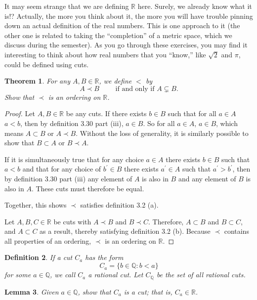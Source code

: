\documentclass{amsart}
\newtheorem{theorem}{Theorem}
\newtheorem{lemma}[theorem]{Lemma}
\newtheorem{definition}[theorem]{Definition}
\newcommand{\Q}{\mathbb Q}
\newcommand{\R}{\mathbb R}
\newcommand{\1}{\mathds{1}}
\def \R {{\mathbb {R}}}
\numberwithin{equation}{section}
\numberwithin{theorem}{section}
\begin{document}
It may seem strange that we are defining $\R$ here.  Surely, we already know what it is!?  Actually, the more you think about it, the more you will have trouble pinning down an actual definition of the real numbers.  This is one approach to it (the other one is related to taking the ``completion'' of a metric space, which we discuss during the semester).  As you go through these exercises, you may find it interesting to think about how real numbers that you ``know,'' like $\sqrt 2$ and $\pi$, could be defined using cuts.


\begin{theorem}
	For any $A, B\in \R$, we define $<$ by
	\[
	A \prec B
	\qquad\text{ if and only if }
	A \subsetneq B.
	\]
	Show that $\prec$ is an ordering on $\R$.
\end{theorem}

\begin{proof}
	Let $A,B \in\R$ be any cuts. If there exists $b\in B$ such that for all $a\in A$ $a<b$, then by definition 3.30 part (iii), $a\in B$. So for all $a\in A$, $a\in B$, which means $A\subset B$ or $A\prec B$. Without the loss of generality, it is similarly possible to show that $B\subset A$ or $B\prec A$. 
	
	If it is simultaneously true that for any choice $a\in A$ there exists $b\in B$ such that $a<b$ and that for any choice of $b^\prime\in B$ there exists $a^\prime\in A$ such that $a^\prime>b^\prime$, then by definition 3.30 part (iii) any element of $A$ is also in $B$ and any element of $B$ is also in $A$. These cuts must therefore be equal.
	
	Together, this shows $\prec $ satisfies definition 3.2 (a). 
	
	Let $A,B,C\in\R$ be cuts with $A\prec B$ and $B\prec C$. Therefore, $A\subset B$ and $B\subset C$, and $A\subset C$ as a result, thereby satisfying definition 3.2 (b). Because $\prec $ contains all properties of an ordering, $\prec $ is an ordering on $\R$.
\end{proof}

\begin{definition}
	If a cut $C_a$ has the form
	\[
	C_a = \{b \in \Q: b < a\}
	\]
	for some $a\in \Q$, we call $C_a$ a {\em rational cut}.  Let $C_\Q$ be the set of all rational cuts.
\end{definition}



\begin{lemma}
	Given $a\in \Q$, show that $C_a$ is a cut; that is, $C_a \in \R$.
\end{lemma}
\end{document}
